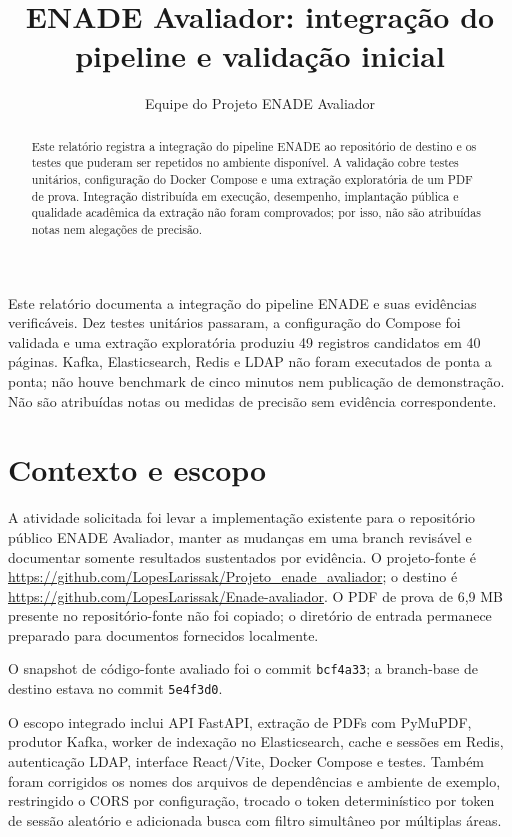 \documentclass[12pt]{article}
\title{ENADE Avaliador: integração do pipeline e validação inicial}
\author{Equipe do Projeto ENADE Avaliador}
\begin{document}
\maketitle

\begin{abstract}
Este relatório registra a integração do pipeline ENADE ao repositório de destino e os testes que puderam ser repetidos no ambiente disponível. A validação cobre testes unitários, configuração do Docker Compose e uma extração exploratória de um PDF de prova. Integração distribuída em execução, desempenho, implantação pública e qualidade acadêmica da extração não foram comprovados; por isso, não são atribuídas notas nem alegações de precisão.
\end{abstract}

\begin{resumo}
Este relatório documenta a integração do pipeline ENADE e suas evidências verificáveis. Dez testes unitários passaram, a configuração do Compose foi validada e uma extração exploratória produziu 49 registros candidatos em 40 páginas. Kafka, Elasticsearch, Redis e LDAP não foram executados de ponta a ponta; não houve benchmark de cinco minutos nem publicação de demonstração. Não são atribuídas notas ou medidas de precisão sem evidência correspondente.
\end{resumo}

\section{Contexto e escopo}

A atividade solicitada foi levar a implementação existente para o repositório público ENADE Avaliador, manter as mudanças em uma branch revisável e documentar somente resultados sustentados por evidência. O projeto-fonte é \url{https://github.com/LopesLarissak/Projeto_enade_avaliador}; o destino é \url{https://github.com/LopesLarissak/Enade-avaliador}. O PDF de prova de 6,9 MB presente no repositório-fonte não foi copiado; o diretório de entrada permanece preparado para documentos fornecidos localmente.

O snapshot de código-fonte avaliado foi o commit \texttt{bcf4a33}; a branch-base de destino estava no commit \texttt{5e4f3d0}.

O escopo integrado inclui API FastAPI, extração de PDFs com PyMuPDF, produtor Kafka, worker de indexação no Elasticsearch, cache e sessões em Redis, autenticação LDAP, interface React/Vite, Docker Compose e testes. Também foram corrigidos os nomes dos arquivos de dependências e ambiente de exemplo, restringido o CORS por configuração, trocado o token determinístico por token de sessão aleatório e adicionada busca com filtro simultâneo por múltiplas áreas.
\end{document}
